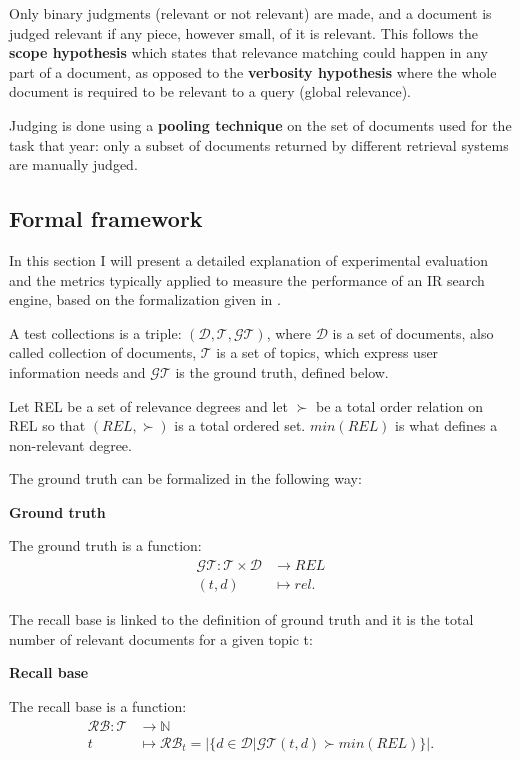 Only binary judgments (relevant or not relevant) are made, and a document
is judged relevant if any piece, however small, of it is relevant. This follows the \textbf{scope
hypothesis} which states that relevance matching could happen in any part of a document, as opposed to the \textbf{verbosity hypothesis} where the whole document is required to be
relevant to a query (global relevance).

Judging is done using a \textbf{pooling technique} on the set of documents used for the task that year: only a subset of documents returned by different retrieval systems are manually judged.

\subsection{Formal framework}

In this section I will present a detailed explanation of experimental evaluation and the metrics typically applied to measure the performance of an IR search engine, based on the formalization given in \cite{virtue}.

A test collections is a triple: $(\mathcal{D}, \mathcal{T}, \mathcal{GT})$, where $\mathcal{D}$ is a set of documents, also called collection of documents, $\mathcal{T}$ is a set of topics, which express user information needs and $\mathcal{GT}$ is the ground truth, defined below.

Let REL be a set of relevance degrees and let $\succ$ be a total order relation on REL so that $(REL, \succ)$ is a total ordered set. $min(REL)$ is what defines a non-relevant degree.

The ground truth can be formalized in the following way:

\begin{definition}{\textbf{Ground truth}}

The ground truth is a function:
\begin{align*}
  \mathcal{GT} \colon \mathcal{T} \times \mathcal{D} &\to REL\\
  (t, d) &\mapsto rel.
\end{align*}

\end{definition}

The recall base is linked to the definition of ground truth and it is the total number of relevant documents for a given topic t:

\begin{definition}{\textbf{Recall base}}

The recall base is a function:
\begin{align*}
  \mathcal{RB} \colon \mathcal{T} &\to \mathbb{N}\\
  t &\mapsto \mathcal{RB}_t = |\{ d \in \mathcal{D} | \mathcal{GT}(t, d) \succ min(REL) \}|.
\end{align*}
\end{definition}


